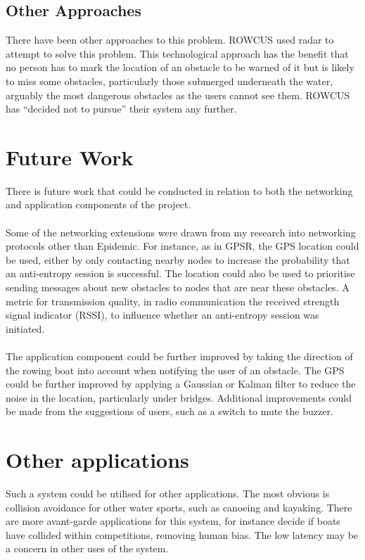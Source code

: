 \documentclass[12pt,a4paper]{report}
\begin{document}
{\subsection{Other Approaches}
There have been other approaches to this problem. ROWCUS used radar to attempt to solve this problem. This technological approach has the benefit that no person has to mark the location of an obstacle to be warned of it but is likely to miss some obstacles, particularly those submerged underneath the water, arguably the most dangerous obstacles as the users cannot see them. ROWCUS has ``decided not to pursue'' their system any further.

\section{Future Work}
There is future work that could be conducted in relation to both the networking and application components of the project. \\ \\
Some of the networking extensions were drawn from my research into networking protocols other than Epidemic. For instance, as in GPSR, the GPS location could be used, either by only contacting nearby nodes to increase the probability that an anti-entropy session is successful. The location could also be used to prioritise sending messages about new obstacles to nodes that are near these obstacles.  A metric for transmission quality, in radio communication the received strength signal indicator (RSSI), to influence whether an anti-entropy session was initiated. \\ \\ 
The application component could be further improved by taking the direction of the rowing boat into account when notifying the user of an obstacle. The GPS could be further improved by applying a Gaussian or Kalman filter to reduce the noise in the location, particularly under bridges. Additional improvements could be made from the suggestions of users, such as a switch to mute the buzzer. 

\section{Other applications}
Such a system could be utilised for other applications. The most obvious is collision avoidance for other water sports, such as canoeing and kayaking. There are more avant-garde applications for this system, for instance decide if boats have collided within competitions, removing human bias. The low latency may be a concern in other uses of the system. 

}
\end{document}
